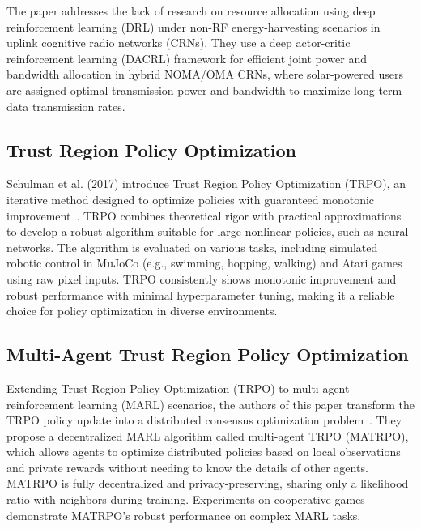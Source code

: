 \documentclass[journal]{IEEEtran}
\begin{document}
The paper addresses the lack of research on resource allocation using deep reinforcement learning 
(DRL) under non-RF energy-harvesting scenarios in uplink cognitive radio networks (CRNs).
They use a deep actor-critic reinforcement learning (DACRL) framework for efficient joint power and
bandwidth allocation in hybrid NOMA/OMA CRNs, where solar-powered users are assigned optimal 
transmission power and bandwidth to maximize long-term data transmission rates.

\subsection{Trust Region Policy Optimization} %
Schulman et al. (2017) introduce Trust Region Policy Optimization (TRPO), an iterative 
method designed to optimize policies with guaranteed monotonic improvement~\cite{schulman2017}. 
TRPO combines theoretical rigor with practical approximations to develop a robust algorithm 
suitable for large nonlinear policies, such as neural networks. 
The algorithm is evaluated on various tasks, including simulated robotic control in MuJoCo 
(e.g., swimming, hopping, walking) and Atari games using raw pixel inputs. 
TRPO consistently shows monotonic improvement and robust performance with minimal hyperparameter 
tuning, making it a reliable choice for policy optimization in diverse environments.

\subsection{Multi-Agent Trust Region Policy Optimization} %
Extending Trust Region Policy Optimization (TRPO) to multi-agent reinforcement learning (MARL) 
scenarios, the authors of this paper transform the TRPO policy update into a distributed consensus 
optimization problem~\cite{li2023c}. They propose a decentralized MARL algorithm called 
multi-agent TRPO (MATRPO), which allows agents to optimize distributed policies based on local 
observations and private rewards without needing to know the details of other agents. 
MATRPO is fully decentralized and privacy-preserving, 
sharing only a likelihood ratio with neighbors during training. 
Experiments on cooperative games demonstrate MATRPO's robust performance on complex MARL tasks.
\end{document}
